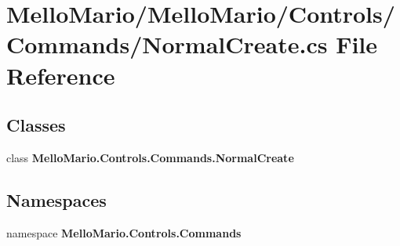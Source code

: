 \section{Mello\+Mario/\+Mello\+Mario/\+Controls/\+Commands/\+Normal\+Create.cs File Reference}
\label{NormalCreate_8cs}
\subsection*{Classes}
\begin{DoxyCompactItemize}
\item 
class \textbf{ Mello\+Mario.\+Controls.\+Commands.\+Normal\+Create}
\end{DoxyCompactItemize}
\subsection*{Namespaces}
\begin{DoxyCompactItemize}
\item 
namespace \textbf{ Mello\+Mario.\+Controls.\+Commands}
\end{DoxyCompactItemize}
